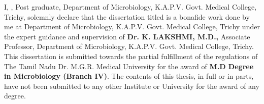 \certificate

\vspace*{0.5in}

\noindent I, \textbf{\MyAuthor}, Post graduate, Department of Microbiology, K.A.P.V. Govt. Medical College, Trichy, solemnly declare that the dissertation titled \textbf {\MyTitle} is a bonafide work done by me at Department of Microbiology, K.A.P.V. Govt. Medical College, Trichy under the expert guidance and supervision of \textbf {Dr. K. LAKSHMI, M.D.,} Associate Professor, Department of Microbiology, K.A.P.V. Govt. Medical College, Trichy. This dissertation is submitted towards the partial fulfillment of the regulations of The Tamil Nadu Dr. M.G.R. Medical University for the award of \textbf {M.D Degree in Microbiology (Branch IV)}. The contents of this thesis, in full or in parts, have not been submitted to any other Institute or University for the award of any degree.


\vspace*{1.0in}

